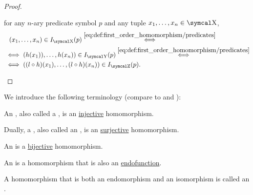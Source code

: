 \begin{proof}
\begin{RefList}
     for any \( n \)-ary predicate symbol \( p \) and any tuple \( x_1, \ldots, x_n \in \CX \),
    \begin{align*}
      &{}\phantom{=}{}
      (x_1, \ldots, x_n) \in I_{\CX}(p)
      \overset {\eqref{eq:def:first_order_homomorphism/predicates}} \iff \\ &\iff
      (h(x_1)), \ldots, h(x_n)) \in I_{\CY}(p)
      \overset {\eqref{eq:def:first_order_homomorphism/predicates}} \iff \\ &\iff
      ((l \circ h)(x_1), \ldots, (l \circ h)(x_n)) \in I_{\CZ}(p).
    \end{align*}
  \end{RefList}
\end{proof}

\begin{definition}\label{def:first_order_homomorphism_invertibility}
  We introduce the following terminology (compare to  and ):
  \begin{DefEnum}
     An , also called a , is an \hyperref[def:function_invertibility/injection]{injective} homomorphism.

     Dually, a , also called an , is an \hyperref[def:function_invertibility/surjection]{surjective} homomorphism.

     An  is a \hyperref[def:function_invertibility/bijection]{bijective} homomorphism.

     An  is a homomorphism that is also an \hyperref[def:endofunction]{endofunction}.

     A homomorphism that is both an endomorphism and an isomorphism is called an .
  \end{DefEnum}
\end{definition}

